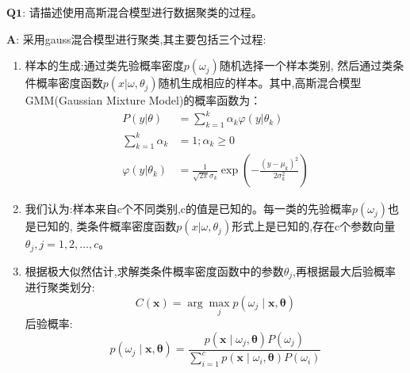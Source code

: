 \documentclass[homework]{IEEEtran}
\begin{document}
\begin{CJK}{UTF8}{gkai}
$\mathbf{Q1}$: 请描述使用高斯混合模型进行数据聚类的过程。 \par
$\mathbf{A}$: 采用gauss混合模型进行聚类,其主要包括三个过程:
\begin{enumerate}
\item 样本的生成:通过类先验概率密度$p(\omega_j)$随机选择一个样本类别,
然后通过类条件概率密度函数$p(x\vert\omega,\theta_j)$随机生成相应的样本。其中,高斯混合模型GMM(Gaussian Mixture Model)的概率函数为：
\begin{align}
P(y \vert \theta) &= \sum \limits_{k=1}^{k} \alpha_k \varphi(y \vert \theta_k) \\
\sum \limits_{k=1}^{k} \alpha_k &=1; \alpha_k \geq 0 \\
\varphi(y \vert \theta_k) &= \frac{1}{\sqrt{2 \pi} \sigma_k} \exp \left(-\frac{(y- \mu_k)^2}{2 \sigma_{k}^{2}}\right)
\end{align}
\item 我们认为:样本来自c个不同类别,c的值是已知的。每一类的先验概率$p(\omega_j)$也是已知的,
类条件概率密度函数$p(x\vert\omega,\theta_j)$形式上是已知的,存在c个参数向量$\theta_j,j = 1,2,\dots,c$。
\item 根据极大似然估计,求解类条件概率密度函数中的参数$\theta_j$,再根据最大后验概率进行聚类划分:
$$
C(\mathbf{x})=\arg \max _{j} p\left(\omega_{j} \mid \mathbf{x}, \boldsymbol{\theta}\right)
$$
后验概率:
$$
p\left(\omega_{j} \mid \mathbf{x}, \boldsymbol{\theta}\right)=\frac{p\left(\mathbf{x} \mid \omega_{j},
 \boldsymbol{\theta}\right) P\left(\omega_{j}\right)}{\sum\limits_{i=1}^{c} p\left(\mathbf{x} \mid \omega_{i}, \boldsymbol{\theta}\right) P\left(\omega_{i}\right)}
$$
\end{enumerate}


\end{CJK}
\end{document}
